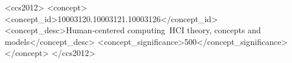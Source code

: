 \documentclass[sigconf]{acmart}
\begin{document}


\begin{CCSXML}
<ccs2012>
   <concept>
       <concept_id>10003120.10003121.10003126</concept_id>
       <concept_desc>Human-centered computing~HCI theory, concepts and models</concept_desc>
       <concept_significance>500</concept_significance>
       </concept>
 </ccs2012>
\end{CCSXML}




\end{document}

